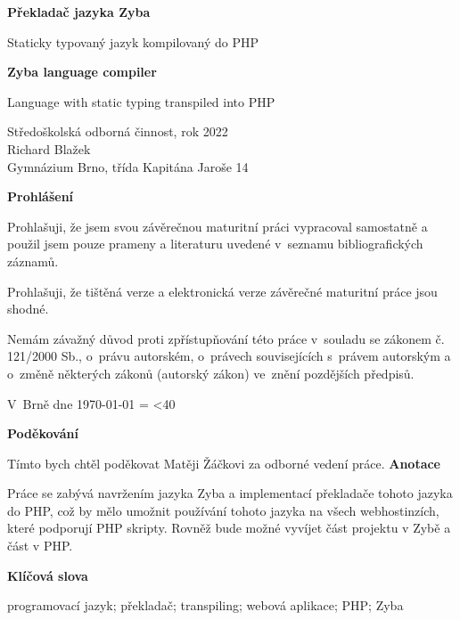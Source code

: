 \documentclass[a4paper,12pt]{article}
\author{Richard Blažek}
\makeatletter
\newcommand{\repeatchar}[2]{%
  \begingroup
  \my@repeat@count=\z@
  \@whilenum\my@repeat@count<#1\do{#2\advance\my@repeat@count\@ne}%
  \endgroup
}
\makeatother
\begin{document}
\begin{titlepage}
    \begin{center}

	\vspace*{3.5cm}            
	\Huge
	\textbf{Překladač jazyka Zyba}
            
	\vspace{0.5cm}
	\LARGE
	Staticky typovaný jazyk kompilovaný do PHP
        
	\vspace*{1.5cm}
	\Huge
	\textbf{Zyba language compiler}
            
	\vspace{0.5cm}
	\LARGE
	Language with static typing transpiled into PHP
            
	\vfill
            
	\large
        Středoškolská odborná činnost, rok 2022\\
	Richard Blažek\\
	Gymnázium Brno, třída Kapitána Jaroše 14
    \end{center}
\end{titlepage}
\thispagestyle{empty}
\Large\textbf{Prohlášení}\normalsize

Prohlašuji, že jsem svou závěrečnou maturitní práci vypracoval samostatně a použil jsem pouze prameny a literaturu uvedené v~seznamu bibliografických záznamů.

Prohlašuji, že tištěná verze a elektronická verze závěrečné maturitní práce jsou shodné.

Nemám závažný důvod proti zpřístupňování této práce v~souladu se zákonem č. 121/2000 Sb., o~právu autorském, o~právech souvisejících s~právem autorským a o~změně některých zákonů (autorský zákon) ve~znění pozdějších předpisů. 

V~Brně dne \today{} \repeatchar{40}{.}
\newpage
\thispagestyle{empty}
\Large\textbf{Poděkování}\normalsize

Tímto bych chtěl poděkovat Matěji Žáčkovi za odborné vedení práce.
\newpage
\thispagestyle{empty}
\Large\textbf{Anotace}\normalsize

Práce se zabývá navržením jazyka Zyba a implementací překladače tohoto jazyka do PHP, což by mělo umožnit používání tohoto jazyka na všech webhostinzích, které podporují PHP skripty. Rovněž bude možné vyvíjet část projektu v Zybě a část v PHP.

\Large\textbf{Klíčová slova}\normalsize

programovací jazyk; překladač; transpiling; webová aplikace; PHP; Zyba
\end{document}
